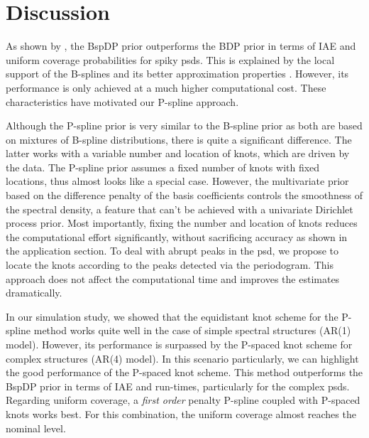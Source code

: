\documentclass[twocolumn,final]{svjour3}
\begin{document}

\section{Discussion}

As shown by \cite{Edwards2018}, the BspDP prior outperforms the BDP prior in terms of IAE and uniform coverage probabilities for spiky psds.  This is explained by the local support of the B-splines and its better approximation properties \citep{Edwards2018}.  However, its performance is only achieved at a much higher computational cost.  These characteristics have motivated our P-spline approach.  

Although the P-spline prior is very similar to the B-spline prior as both are based on mixtures of B-spline distributions, there is quite a significant difference.  The latter works with a variable number and location of knots, which are driven by the data.  The P-spline prior assumes a fixed number of knots  with fixed locations, thus almost looks like a special case. However, the multivariate prior based on the difference penalty of the basis coefficients controls the smoothness of the spectral density, a feature that can't be achieved with a univariate Dirichlet process prior. Most importantly, fixing the number and location of knots reduces the computational effort significantly, without sacrificing accuracy as shown in the application section.  To deal with abrupt peaks in the psd, we propose to locate the knots according to the peaks detected via the periodogram.  This approach does not affect the computational time and improves the estimates dramatically. %

In our simulation study, we showed that the equidistant knot scheme for the P-spline method works quite well in the case of simple spectral structures (AR(1) model).  However, its performance is surpassed by the P-spaced knot scheme for complex structures (AR(4) model).  In this scenario particularly, we can highlight the good performance of the P-spaced knot scheme. This method outperforms the BspDP prior in terms of IAE and run-times, particularly for the complex psds.    Regarding uniform coverage,  a {\em first order} penalty P-spline coupled with
P-spaced knots works best. For this combination, the uniform coverage almost reaches the nominal level.
\end{document}
